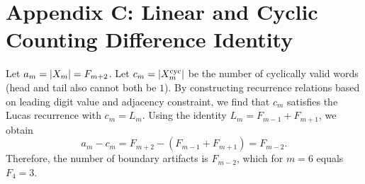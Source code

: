 \section{Appendix C: Linear and Cyclic Counting Difference Identity}
\label{app:linear-cyclic}

Let $a_m=\left\lvert X_m\right\rvert=F_{m+2}$. Let $c_m=\left\lvert X_m^{\mathrm{cyc}}\right\rvert$ be the number of cyclically valid words (head and tail also cannot both be $1$). By constructing recurrence relations based on leading digit value and adjacency constraint, we find that $c_m$ satisfies the Lucas recurrence with $c_m=L_m$. Using the identity $L_m=F_{m-1}+F_{m+1}$, we obtain
\[
a_m-c_m=F_{m+2}-(F_{m-1}+F_{m+1})=F_{m-2}.
\]
Therefore, the number of boundary artifacts is $F_{m-2}$, which for $m=6$ equals $F_4=3$.
